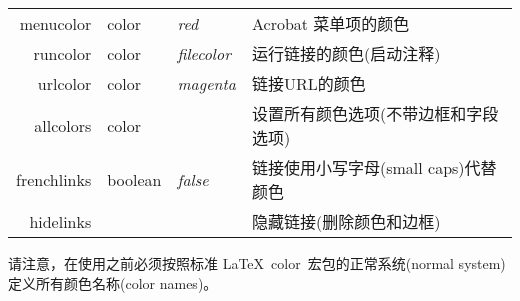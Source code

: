 \documentclass{article}
\newcommand*{\xpackage}[1]{\textsf{#1}}
\begin{document}
\begin{longtable}{@{}>{\ttfamily}rl>{\itshape}lp{8cm}@{}}
  menucolor      & color         & red        & Acrobat 菜单项的颜色                                                                                                                                                                                                        \\
  runcolor       & color         & filecolor  & 运行链接的颜色(启动注释)                                                                                                                                                                                                         \\
  urlcolor       & color         & magenta    & 链接URL的颜色                                                                                                                                                                                                              \\
  allcolors      & color         &            & 设置所有颜色选项(不带边框和字段选项)                                                                                                                                                                                                   \\
  frenchlinks    & boolean       & false      & 链接使用小写字母(small caps)代替颜色                                                                                                                                                                                              \\
  hidelinks      &               &            & 隐藏链接(删除颜色和边框)                                                                                                                                                                                                         \\
\end{longtable} \smallskip

请注意，在使用之前必须按照标准 \LaTeX\ \xpackage{color}\ 宏包的正常系统(normal system)定义所有颜色名称(color names)。
\end{document}
